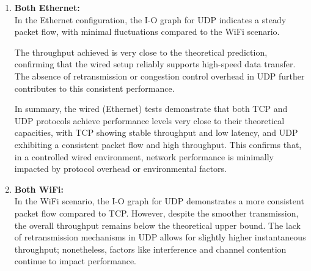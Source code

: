         \begin{enumerate}

            \item \textbf{Both Ethernet:} \\
                In the Ethernet configuration, the I-O graph for UDP indicates a steady packet flow, with minimal fluctuations compared to the WiFi scenario.
                

                The throughput achieved is very close to the theoretical prediction, confirming that the wired setup reliably supports high-speed data transfer. 
                The absence of retransmission or congestion control overhead in UDP further contributes to this consistent performance.
                
                In summary, the wired (Ethernet) tests demonstrate that both TCP and UDP protocols achieve performance levels very close to their theoretical capacities, with TCP showing stable throughput and low latency, and UDP exhibiting a consistent packet flow and high throughput. 
                This confirms that, in a controlled wired environment, network performance is minimally impacted by protocol overhead or environmental factors.

            \item \textbf{Both WiFi:} \\
                In the WiFi scenario, the I-O graph for UDP demonstrates a more consistent packet flow compared to TCP. 
                However, despite the smoother transmission, the overall throughput remains below the theoretical upper bound. 
                The lack of retransmission mechanisms in UDP allows for slightly higher instantaneous throughput; nonetheless, factors like interference and channel contention continue to impact performance.
                


\end{enumerate}
